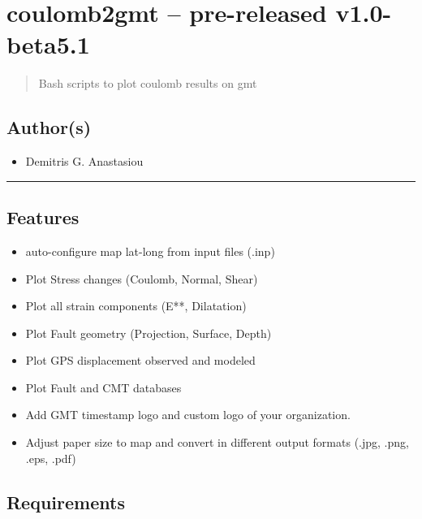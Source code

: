 \section{coulomb2gmt -- pre-released
v1.0-beta5.1}\label{coulomb2gmt-pre-released-v1.0-beta5.1}

\begin{quote}
Bash scripts to plot coulomb results on gmt
\end{quote}

\subsection{Author(s)}\label{authors}

\begin{itemize}

\item
  Demitris G. Anastasiou
\end{itemize}

\begin{center}\rule{0.5\linewidth}{\linethickness}\end{center}

\subsection{Features}\label{features}

\begin{itemize}
\item
  auto-configure map lat-long from input files (.inp)
\item
  Plot Stress changes (Coulomb, Normal, Shear)
\item
  Plot all strain components (E**, Dilatation)
\item
  Plot Fault geometry (Projection, Surface, Depth)
\item
  Plot GPS displacement observed and modeled
\item
  Plot Fault and CMT databases
\item
  Add GMT timestamp logo and custom logo of your organization.
\item
  Adjust paper size to map and convert in different output formats
  (.jpg, .png, .eps, .pdf)
\end{itemize}

\subsection{Requirements}\label{requirements}

